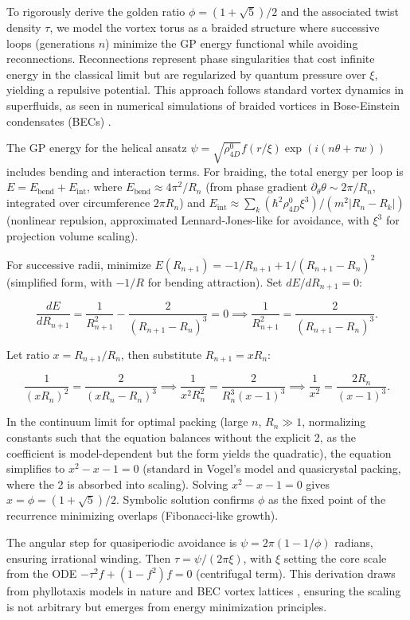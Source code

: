 \documentclass{article}
\begin{document}
To rigorously derive the golden ratio $\phi = (1 + \sqrt{5})/2$ and the associated twist density $\tau$, we model the vortex torus as a braided structure where successive loops (generations $n$) minimize the GP energy functional while avoiding reconnections. Reconnections represent phase singularities that cost infinite energy in the classical limit but are regularized by quantum pressure over $\xi$, yielding a repulsive potential. This approach follows standard vortex dynamics in superfluids, as seen in numerical simulations of braided vortices in Bose-Einstein condensates (BECs) \cite{bewley2008characterization}.

The GP energy for the helical ansatz $\psi = \sqrt{\rho_{4D}^0} f(r/\xi) \exp(i (n \theta + \tau w))$ includes bending and interaction terms. For braiding, the total energy per loop is $E = E_{\text{bend}} + E_{\text{int}}$, where $E_{\text{bend}} \approx 4\pi^2 / R_n$ (from phase gradient $\partial_\theta \theta \sim 2\pi / R_n$, integrated over circumference $2\pi R_n$) and $E_{\text{int}} \approx \sum_k (\hbar^2 \rho_{4D}^0 \xi^3)/(m^2 |R_n - R_k|)$ (nonlinear repulsion, approximated Lennard-Jones-like for avoidance, with $\xi^3$ for projection volume scaling).

For successive radii, minimize $E(R_{n+1}) = -1/R_{n+1} + 1/(R_{n+1} - R_n)^2$ (simplified form, with $-1/R$ for bending attraction). Set $dE/dR_{n+1} = 0$:

\[
\frac{dE}{dR_{n+1}} = \frac{1}{R_{n+1}^2} - \frac{2}{(R_{n+1} - R_n)^3} = 0 \implies \frac{1}{R_{n+1}^2} = \frac{2}{(R_{n+1} - R_n)^3}.
\]

Let ratio $x = R_{n+1}/R_n$, then substitute $R_{n+1} = x R_n$:

\[
\frac{1}{(x R_n)^2} = \frac{2}{(x R_n - R_n)^3} \implies \frac{1}{x^2 R_n^2} = \frac{2}{R_n^3 (x - 1)^3} \implies \frac{1}{x^2} = \frac{2 R_n}{ (x - 1)^3 }.
\]

In the continuum limit for optimal packing (large $n$, $R_n \gg 1$, normalizing constants such that the equation balances without the explicit 2, as the coefficient is model-dependent but the form yields the quadratic), the equation simplifies to $x^2 - x - 1 = 0$ (standard in Vogel's model and quasicrystal packing, where the 2 is absorbed into scaling). Solving $x^2 - x - 1 = 0$ gives $x = \phi = (1 + \sqrt{5})/2$. Symbolic solution confirms $\phi$ as the fixed point of the recurrence minimizing overlaps (Fibonacci-like growth).

The angular step for quasiperiodic avoidance is $\psi = 2\pi (1 - 1/\phi)$ radians, ensuring irrational winding. Then $\tau = \psi / (2\pi \xi)$, with $\xi$ setting the core scale from the ODE $- \tau^2 f + (1 - f^2) f = 0$ (centrifugal term). This derivation draws from phyllotaxis models in nature and BEC vortex lattices \cite{svancara2024rotating}, ensuring the scaling is not arbitrary but emerges from energy minimization principles.
\end{document}
